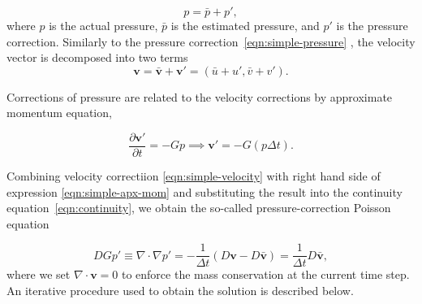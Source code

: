 \documentclass{article}
\begin{document}
\begin{equation}\label{eqn:simple-pressure}
	p = 	\bar p + p',
\end{equation}
where $p$ is the actual pressure, $\bar p$ is the estimated pressure, and $p'$ is the pressure correction. Similarly to the pressure correction~\eqref{eqn:simple-pressure} , the velocity vector is decomposed into two terms
\begin{equation}\label{eqn:simple-velocity}
	\boldsymbol{v}=\boldsymbol{\bar v}+\boldsymbol{v}'=(\bar u + u', \bar v + v').
\end{equation}

Corrections of pressure are related to the velocity corrections by approximate momentum equation,

\begin{equation}\label{eqn:simple-apx-mom}
\frac{\partial \boldsymbol{v}'}{\partial t}=-Gp\implies \boldsymbol{v}'=-G ( p\Delta t).
\end{equation}

Combining velocity correctiion \eqref{eqn:simple-velocity} with right hand side of expression \eqref{eqn:simple-apx-mom} and substituting the result into the continuity equation~\eqref{eqn:continuity}, we obtain the so-called pressure-correction Poisson equation


\begin{equation}\label{eqn:simple-poisson}
DGp'\equiv\nabla\cdot\nabla p'=-\frac{1}{\Delta t}\left( D \boldsymbol{v}-D\boldsymbol{\bar v} \right)=\frac{1}{\Delta t}D\boldsymbol{\bar v},
\end{equation}
where we set $\nabla\cdot\boldsymbol{v}=0$ to enforce the mass conservation at the current time step. An iterative procedure used to obtain the solution is described below.
\end{document}
